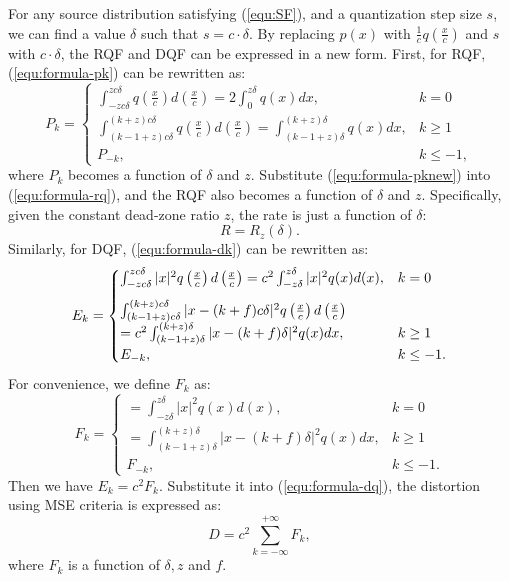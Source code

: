 \documentclass[smallabstract,smallcaptions]{dccpaper}
\begin{document}
For any source distribution satisfying (\ref{equ:SF}), and a quantization step size $s$, we can find a value $\delta$ such that $s=c \cdot \delta$. By replacing $p(x)$ with $\frac{1}{c} q(\frac{x}{c})$ and $s$ with $c \cdot \delta$, the RQF and DQF can be expressed in a new form. First, for RQF, (\ref{equ:formula-pk}) can be rewritten as:
\begin{equation}\label{equ:formula-pknew}
	P_k =
	\begin{cases}
		\int_{-z c\delta}^{z c\delta} q\left(\frac{x}{c}\right) d\left(\frac{x}{c}\right)
		= 2 \int_{0}^{z \delta} q(x) dx,
		& k=0 \\
		\int_{(k-1+z) c\delta}^{(k+z) c\delta} q\left(\frac{x}{c}\right) d\left(\frac{x}{c}\right)
		=\int_{(k-1+z) \delta}^{(k+z) \delta} q(x) dx,
		& k \ge 1 \\
		P_{-k},
		& k \le -1 ,
	\end{cases}
\end{equation} 
where $P_k$ becomes a function of $\delta$ and $z$. Substitute (\ref{equ:formula-pknew}) into (\ref{equ:formula-rq}), and the RQF also becomes a function of $\delta$ and $z$. Specifically, given the constant dead-zone ratio $z$, the rate is just a function of $\delta$: 
\begin{equation}\label{equ:formula-rqnew}
	R = R_z(\delta).
\end{equation}
Similarly, for DQF, (\ref{equ:formula-dk}) can be rewritten as:  
\begin{equation}\label{equ:formula-dknew}
	E_k =
	\begin{cases}
		\int_{-z c\delta}^{z c\delta} |x|^2 q\left(\frac{x}{c}\right) d\left(\frac{x}{c}\right)
		= c^2\int_{-z \delta}^{z \delta} |x|^2 q(x) d(x),
		& k=0 \vspace{8pt} \\
		\int_{(k-1+z) c\delta}^{(k+z) c\delta} |x - (k+f) c\delta|^2 q\left(\frac{x}{c}\right) d\left(\frac{x}{c}\right)\\
		=c^2\int_{(k-1+z) \delta}^{(k+z) \delta} |x - (k+f) \delta|^2 q(x) dx,
		& k \ge 1 \\
		E_{-k},
		& k \le -1 .
	\end{cases}
\end{equation} 
For convenience, we define $F_k$ as:
\begin{equation}\label{equ:formula-fk}
	F_k =
	\begin{cases}
		= \int_{-z \delta}^{z \delta} |x|^2 q(x) d(x),
		& k=0 \\
		=\int_{(k-1+z) \delta}^{(k+z) \delta} |x - (k+f) \delta|^2 q(x) dx,
		& k \ge 1 \\
		F_{-k},
		& k \le -1 .
	\end{cases}
\end{equation}
Then we have $E_k = c^2 F_k$. Substitute it into (\ref{equ:formula-dq}), the distortion using MSE criteria is expressed as:
\begin{equation}\label{equ:formula-dqnew}
	D = c^2 \sum_{k=-\infty}^{+\infty} F_k, 
\end{equation}
where $F_k$ is a function of $\delta, z$ and $f$.
\end{document}
